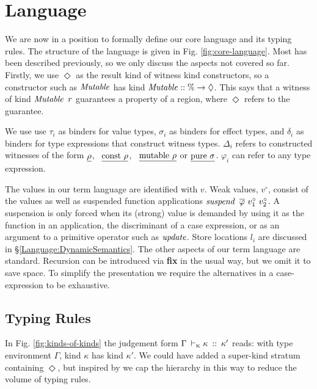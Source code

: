 
\section{Language}

We are now in a position to formally define our core language and its typing rules. The structure of the language is given in Fig. \ref{fig:core-language}. Most has been described previously, so we only discuss the aspects not covered so far. Firstly, we use $\Diamond$ as the result kind of witness kind constructors, so a constructor such as $\operatorname{\mathit{Mutable}}$ has kind $\operatorname{\mathit{Mutable}} :: \% \to \Diamond$. This says that a witness of kind $\operatorname{\mathit{Mutable}} \ r$ guarantees a property of a region, where $\Diamond$ refers to the guarantee.

We use use $\tau_i$ as binders for value types, $\sigma_i$ as binders for effect types, and $\delta_i$ as binders for type expressions that construct witness types. $\Delta_i$ refers to constructed witnesses of the form $\underline{\rho}$, \ $\underline{\textrm{const} \ \rho}$, \ $\underline{\textrm{mutable} \ \rho}$ or $\underline{\textrm{pure} \ \sigma}$. $\varphi_i$ can refer to any type expression. 

The values in our term language are identified with $v$. Weak values, $v^\circ$, consist of the values as well as suspended function applications $\operatorname{\mathit{suspend}} \ \overline{\varphi} \ v_1^\circ \ v_2^\circ$. A suspension is only forced when its (strong) value is demanded by using it as the function in an application, the discriminant of a case expression, or as an argument to a primitive operator such as $\operatorname{\mathit{update}}$. Store locations $l_i$ are discussed in \S\ref{Language:DynamicSemantics}. The other aspects of our term language are standard. Recursion can be introduced via \textbf{fix} in the usual way, but we omit it to save space. To simplify the presentation we require the alternatives in a case-expression to be exhaustive.




\clearpage{}

\vspace{-3em}
\subsection{Typing Rules}
In Fig. \ref{fig:kinds-of-kinds} the judgement form $\Gamma \: \vdash_\textrm{\tiny{K}}\kappa \: :: \: \kappa'$ reads: with type environment $\Gamma$, kind $\kappa$ has kind $\kappa'$. We could have added a super-kind stratum containing $\Diamond$, but inspired by \cite{peyton-jones:henk} we cap the hierarchy in this way to reduce the volume of typing rules. 

